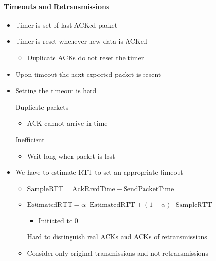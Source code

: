 \paragraph{Timeouts and Retransmissions}
\begin{itemize}
    \item Timer is set of last ACKed packet
    \item Timer is reset whenever new data is ACKed
        \begin{itemize}
            \item Duplicate ACKs do not reset the timer
        \end{itemize}
    \item Upon timeout the next expected packet is resent
    \item Setting the timeout is hard
        \begin{itemize}
             Duplicate packets
                \begin{itemize}
                    \item ACK cannot arrive in time
                \end{itemize}
             Inefficient
                \begin{itemize}
                    \item Wait long when packet is lost
                \end{itemize}
        \end{itemize}
    \item We have to estimate RTT to set an appropriate timeout
        \begin{itemize}
                \begin{itemize}
                    \item $\text{SampleRTT} = \text{AckRcvdTime} - \text{SendPacketTime}$
                    \item $\text{EstimatedRTT} = \alpha \cdot \text{EstimatedRTT} + (1 - \alpha) \cdot \text{SampleRTT}$
                        \begin{itemize}
                            \item Initiated to $0$
                        \end{itemize}
                    \icon Hard to distinguish real ACKs and ACKs of retransmissions
                \end{itemize}
                \begin{itemize}
                    \item Consider only original transmissions and not retransmissions

\end{itemize}
\end{itemize}
\end{itemize}
